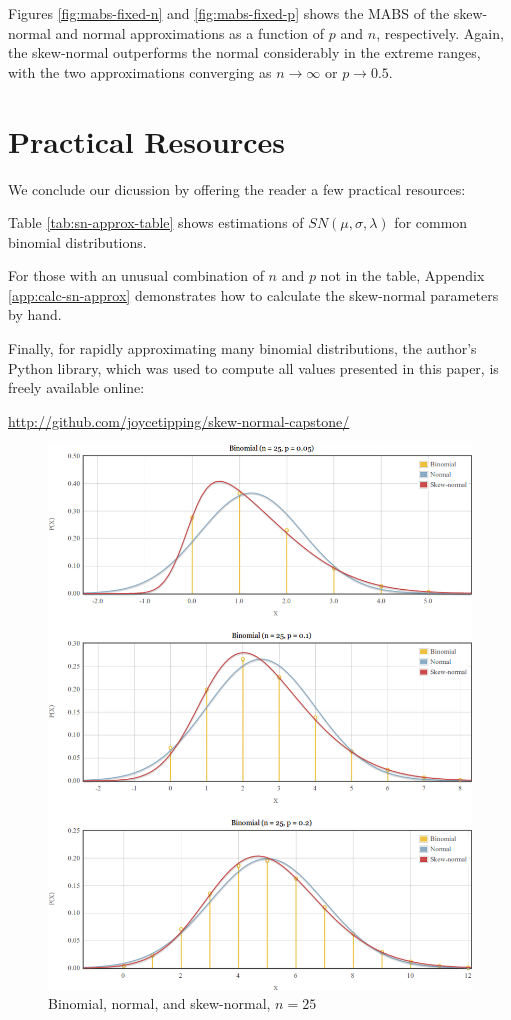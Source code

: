 \documentclass{article}
\begin{document}
Figures \ref{fig:mabs-fixed-n} and \ref{fig:mabs-fixed-p} shows the MABS of the
skew-normal and normal approximations as a function of $p$ and $n$,
respectively. Again, the skew-normal outperforms the normal considerably in the
extreme ranges, with the two approximations converging as $n \rightarrow
\infty$ or $p \rightarrow 0.5$.

\section{Practical Resources}
\label{sec:resources}

We conclude our dicussion by offering the reader a few practical resources:

Table \ref{tab:sn-approx-table} shows estimations of $SN(\mu, \sigma, \lambda)$
for common binomial distributions.

For those with an unusual combination of $n$ and $p$ not in the table, Appendix
\ref{app:calc-sn-approx} demonstrates how to calculate the skew-normal
parameters by hand.

Finally, for rapidly approximating many binomial distributions, the author's
Python library, which was used to compute all values presented in this paper,
is freely available online:

\url{http://github.com/joycetipping/skew-normal-capstone/}

\begin{figure}
  \centering
  \includegraphics[width=\textwidth]{../images/comparison-n25.png}
  \caption{Binomial, normal, and skew-normal, $n=25$}
  \label{fig:comparison-n25}
\end{figure}
\end{document}
